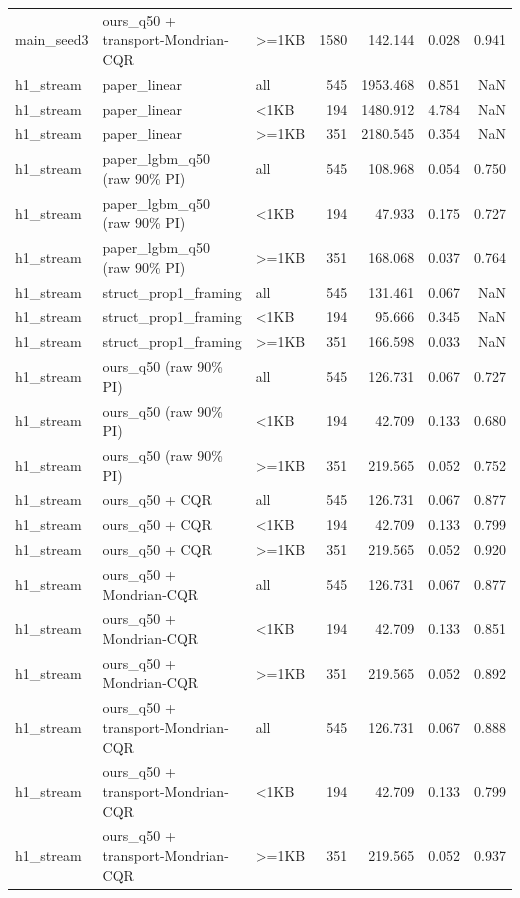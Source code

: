 \begin{table}
\begin{tabular}{lllrrrr}
main\_seed3 & ours\_q50 + transport-Mondrian-CQR & >=1KB & 1580 & 142.144 & 0.028 & 0.941 \\
h1\_stream & paper\_linear & all & 545 & 1953.468 & 0.851 & NaN \\
h1\_stream & paper\_linear & <1KB & 194 & 1480.912 & 4.784 & NaN \\
h1\_stream & paper\_linear & >=1KB & 351 & 2180.545 & 0.354 & NaN \\
h1\_stream & paper\_lgbm\_q50 (raw 90\% PI) & all & 545 & 108.968 & 0.054 & 0.750 \\
h1\_stream & paper\_lgbm\_q50 (raw 90\% PI) & <1KB & 194 & 47.933 & 0.175 & 0.727 \\
h1\_stream & paper\_lgbm\_q50 (raw 90\% PI) & >=1KB & 351 & 168.068 & 0.037 & 0.764 \\
h1\_stream & struct\_prop1\_framing & all & 545 & 131.461 & 0.067 & NaN \\
h1\_stream & struct\_prop1\_framing & <1KB & 194 & 95.666 & 0.345 & NaN \\
h1\_stream & struct\_prop1\_framing & >=1KB & 351 & 166.598 & 0.033 & NaN \\
h1\_stream & ours\_q50 (raw 90\% PI) & all & 545 & 126.731 & 0.067 & 0.727 \\
h1\_stream & ours\_q50 (raw 90\% PI) & <1KB & 194 & 42.709 & 0.133 & 0.680 \\
h1\_stream & ours\_q50 (raw 90\% PI) & >=1KB & 351 & 219.565 & 0.052 & 0.752 \\
h1\_stream & ours\_q50 + CQR & all & 545 & 126.731 & 0.067 & 0.877 \\
h1\_stream & ours\_q50 + CQR & <1KB & 194 & 42.709 & 0.133 & 0.799 \\
h1\_stream & ours\_q50 + CQR & >=1KB & 351 & 219.565 & 0.052 & 0.920 \\
h1\_stream & ours\_q50 + Mondrian-CQR & all & 545 & 126.731 & 0.067 & 0.877 \\
h1\_stream & ours\_q50 + Mondrian-CQR & <1KB & 194 & 42.709 & 0.133 & 0.851 \\
h1\_stream & ours\_q50 + Mondrian-CQR & >=1KB & 351 & 219.565 & 0.052 & 0.892 \\
h1\_stream & ours\_q50 + transport-Mondrian-CQR & all & 545 & 126.731 & 0.067 & 0.888 \\
h1\_stream & ours\_q50 + transport-Mondrian-CQR & <1KB & 194 & 42.709 & 0.133 & 0.799 \\
h1\_stream & ours\_q50 + transport-Mondrian-CQR & >=1KB & 351 & 219.565 & 0.052 & 0.937 \\

\end{tabular}
\end{table}
